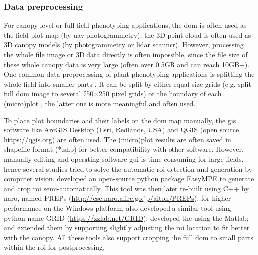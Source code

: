 \subsubsection{Data preprocessing} \label{sec:prepro}

For canopy-level or full-field phenotyping applications, the \gls{dom} is often used as the field plot map (by \gls{uav} photogrammetry); the 3D point cloud is often used as 3D canopy models (by photogrammetry or \gls{lidar} scanner). However, processing the whole file image or 3D data directly is often impossible, since the file size of these whole canopy data is very large (often over 0.5GB and can reach 10GB+). One common data preprocessing of plant phenotyping applications is splitting the whole field into smaller parts \citep{wang_easyidp_2021}. It can be split by either equal-size grids (e.g. \citet{bauer_combining_2019} split full \gls{dom} image to several 250$\times$250 pixel grids) or the boundary of each (micro)plot \citep{tresch_easympe_2019}, the latter one is more meaningful and often used.

To place plot boundaries and their labels on the \gls{dom} map manually, the \gls{gis} software like ArcGIS Desktop (Esri, Redlands, USA) and QGIS (open source, \url{https://qgis.org}) are often used. The (micro)plot results are often saved in shapefile format (*.shp) for better compatibility with other software. However, manually editing and operating software \gls{gui} is time-consuming for large fields, hence several studies tried to solve the automatic \gls{roi} detection and generation by computer vision. \citep{tresch_easympe_2019} developed an open-source python package EasyMPE to generate and crop \gls{roi} semi-automatically. This tool was then later re-built using C++ by \gls{naro}, named PREPs (\url{http://cse.naro.affrc.go.jp/aitoh/PREPs}), for higher performance on the Windows platform. \citet{chen_grid_2020} also developed a similar tool using python name GRID (\url{https://zzlab.net/GRID}); \citet{mortensen_drone_2019} developed the using the Matlab; and \citep{sara_automatic_2021} extended them by supporting slightly adjusting the \gls{roi} location to fit better with the canopy. All these tools also support cropping the full \gls{dom} to small parts within the \gls{roi} for postprocessing.

